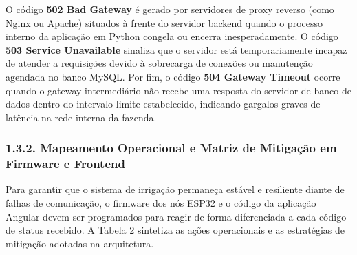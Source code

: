 O código \textbf{502 Bad Gateway} é gerado por servidores de proxy reverso (como Nginx ou Apache) situados à frente do servidor backend quando o processo interno da aplicação em Python congela ou encerra inesperadamente. O código \textbf{503 Service Unavailable} sinaliza que o servidor está temporariamente incapaz de atender a requisições devido à sobrecarga de conexões ou manutenção agendada no banco MySQL. Por fim, o código \textbf{504 Gateway Timeout} ocorre quando o gateway intermediário não recebe uma resposta do servidor de banco de dados dentro do intervalo limite estabelecido, indicando gargalos graves de latência na rede interna da fazenda.

\subsubsection*{1.3.2. Mapeamento Operacional e Matriz de Mitigação em Firmware e Frontend}

Para garantir que o sistema de irrigação permaneça estável e resiliente diante de falhas de comunicação, o firmware dos nós ESP32 e o código da aplicação Angular devem ser programados para reagir de forma diferenciada a cada código de status recebido. A Tabela 2 sintetiza as ações operacionais e as estratégias de mitigação adotadas na arquitetura.

